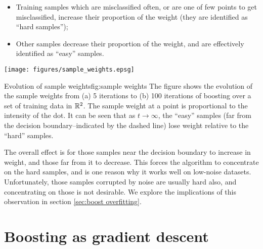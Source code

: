 \begin{itemize}
\item	Training samples which are misclassified often, or are one of 
	few points to get misclassified, increase their proportion of
	the weight (they are identified as ``hard samples'');
\item	Other samples decrease their proportion of the weight, and are
	effectively identified as ``easy'' samples.
\end{itemize}

\begin{linefigure}
\begin{center}
\texttt{[image: figures/sample\_weights.epsg]}
\end{center}
\begin{capt}{Evolution of sample weights}{fig:sample weights}
The figure shows the evolution of the sample weights from (a) 5
iterations to (b) 100 iterations of boosting over a set of training
data in $\mathbb{R}^2$.  The sample weight at a point is proportional to the
intensity of the dot.  It can be seen that as $t \rightarrow \infty$,
the ``easy'' samples (far from the decision boundary--indicated by the
dashed line) lose weight relative to the ``hard'' samples.   
\end{capt}
\end{linefigure}

The overall effect is for those samples near the decision boundary to
increase in weight, and those far from it to decrease.  This forces
the algorithm to concentrate on the hard samples, and is one reason
why it works well on low-noise datasets.  Unfortunately, those samples
corrupted by noise are usually hard also, and concentrating on those
is not desirable.  We explore the implications of this observation in
section \ref{sec:boost overfitting}.


\section{Boosting as gradient descent}
\label{sec:theory:gradient descent}


